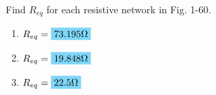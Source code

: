 Find $R_{eq}$ for each resistive network in Fig. 1-60.
\begin{enumerate}[leftmargin=2cm,labelsep=.5cm,label=\bfseries\alph*)]
	\item $
	\begin{aligned}[t]
	R_{eq} &= \hlbox{73.195\qw{\ohm}}
	\end{aligned} $
	\\[1cm]
	
	\item $
	\begin{aligned}[t]
	R_{eq} &= \hlbox{19.848\qw{\ohm}}
	\end{aligned} $
	\\[1cm]
	
	\item $
	\begin{aligned}[t]
	R_{eq} &= \hlbox{22.5\qw{\ohm}}
	\end{aligned} $
	\\[1cm]
\end{enumerate}